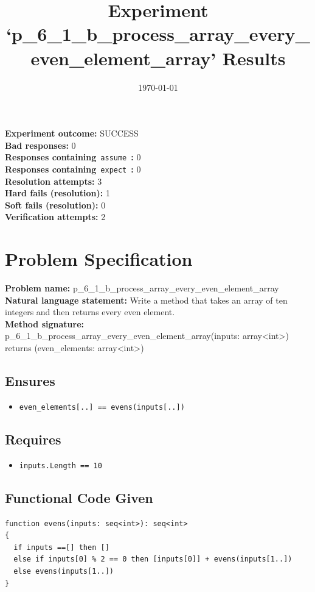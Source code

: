 \documentclass{article}
\begin{document}
\title{Experiment `p\_6\_1\_b\_process\_array\_every\_even\_element\_array' Results}
\author{\today}
\date{}
\maketitle
\textbf{Experiment outcome: }SUCCESS
\\\textbf{Bad responses: }0
\\\textbf{Responses containing}~\texttt{assume}~\textbf{: }0
\\\textbf{Responses containing}~\texttt{expect}~\textbf{: }0
\\\textbf{Resolution attempts: }3
\\\textbf{Hard fails (resolution): }1
\\\textbf{Soft fails (resolution): }0
\\\textbf{Verification attempts: }2
\section*{Problem Specification}
\textbf{Problem name: }p\_6\_1\_b\_process\_array\_every\_even\_element\_array
\\\textbf{Natural language statement: }Write a method that takes an array of ten integers and then returns every even element.
\\\textbf{Method signature: }p\_6\_1\_b\_process\_array\_every\_even\_element\_array(inputs: array<int>) returns (even\_elements: array<int>)
\subsection*{Ensures}
\begin{itemize}
\item \texttt{even\_elements[..] == evens(inputs[..])}
\end{itemize}
\subsection*{Requires}
\begin{itemize}
\item \texttt{inputs.Length == 10}
\end{itemize}
\subsection*{Functional Code Given}
\begin{lstlisting}
function evens(inputs: seq<int>): seq<int>
{
  if inputs ==[] then []
  else if inputs[0] % 2 == 0 then [inputs[0]] + evens(inputs[1..])
  else evens(inputs[1..])
}
\end{lstlisting}
\clearpage
\end{document}
